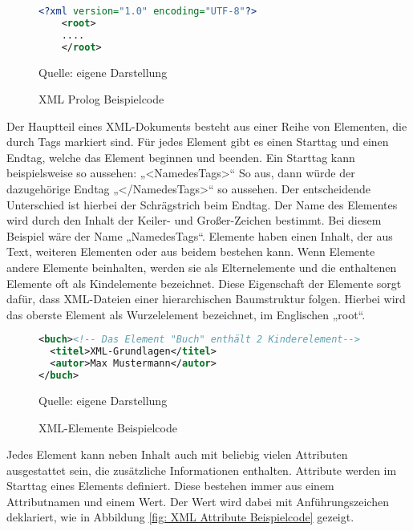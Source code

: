\begin{figure}[H]
\centering
\begin{minipage}{0.95\textwidth}
\begin{lstlisting}[language=XML]
<?xml version="1.0" encoding="UTF-8"?>
    <root>
    ....
    </root>
\end{lstlisting}
\end{minipage}
\caption{XML Prolog Beispielcode}
\label{fig: XML Prolog Beispielcode}
    {Quelle: eigene Darstellung}
\end{figure}


Der Hauptteil eines \ac{XML}-Dokuments besteht aus einer Reihe von Elementen, die durch Tags markiert sind.
Für jedes Element gibt es einen Starttag und einen Endtag, welche das Element beginnen und beenden.
Ein Starttag kann beispielsweise so aussehen: „<NamedesTags>“ So aus, dann würde der dazugehörige Endtag „</NamedesTags>“ so aussehen.
Der entscheidende Unterschied ist hierbei der Schrägstrich beim Endtag.
Der Name des Elementes wird durch den Inhalt der Keiler- und Großer-Zeichen bestimmt.
Bei diesem Beispiel wäre der Name „NamedesTags“.
Elemente haben einen Inhalt, der aus Text, weiteren Elementen oder aus beidem bestehen kann.
Wenn Elemente andere Elemente beinhalten, werden sie als Elternelemente und die enthaltenen Elemente oft als Kindelemente bezeichnet.
Diese Eigenschaft der Elemente sorgt dafür, dass \ac{XML}-Dateien einer hierarchischen Baumstruktur folgen.
Hierbei wird das oberste Element als Wurzelelement bezeichnet, im Englischen „root“. \cite*[10-14]{Becher2022}

\begin{figure}[H]
\centering
\begin{minipage}{0.95\textwidth}
\begin{lstlisting}[language=XML]
<buch><!-- Das Element "Buch" enthält 2 Kinderelement-->
  <titel>XML-Grundlagen</titel>
  <autor>Max Mustermann</autor>
</buch>
\end{lstlisting}
\end{minipage}
\caption{XML-Elemente Beispielcode}
\label{fig:XML Elemente Beispielcode}
    {Quelle: eigene Darstellung}
\end{figure}

Jedes Element kann neben Inhalt auch mit beliebig vielen Attributen ausgestattet sein, die zusätzliche Informationen enthalten.
Attribute werden im Starttag eines Elements definiert. Diese bestehen immer aus einem Attributnamen und einem Wert.
Der Wert wird dabei mit Anführungszeichen deklariert, wie in Abbildung \ref{fig: XML Attribute Beispielcode} gezeigt. \cite*[10-14]{Becher2022}

